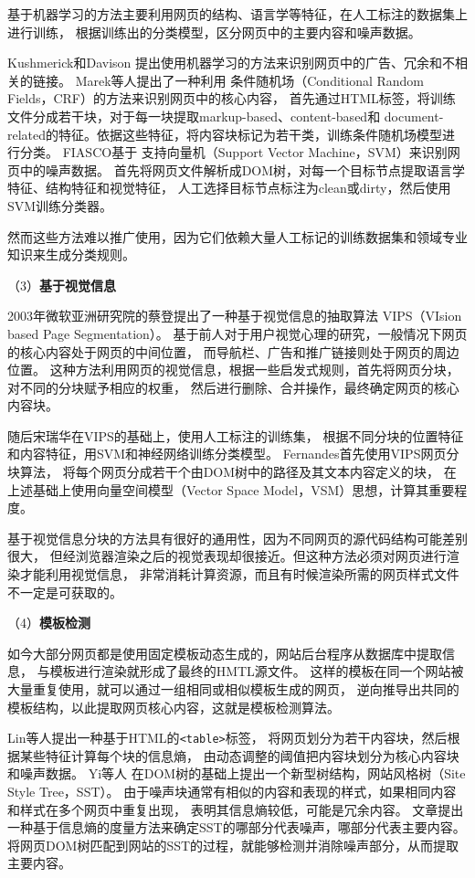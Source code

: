 基于机器学习的方法主要利用网页的结构、语言学等特征，在人工标注的数据集上进行训练，
根据训练出的分类模型，区分网页中的主要内容和噪声数据。

Kushmerick和Davison
提出使用机器学习的方法来识别网页中的广告、冗余和不相关的链接。
Marek等人提出了一种利用
条件随机场（Conditional Random Fields，CRF）的方法来识别网页中的核心内容，
首先通过HTML标签，将训练文件分成若干块，对于每一块提取markup-based、content-based和
document-related的特征。依据这些特征，将内容块标记为若干类，训练条件随机场模型进行分类。
FIASCO基于
支持向量机（Support Vector Machine，SVM）来识别网页中的噪声数据。
首先将网页文件解析成DOM树，对每一个目标节点提取语言学特征、结构特征和视觉特征，
人工选择目标节点标注为clean或dirty，然后使用SVM训练分类器。

然而这些方法难以推广使用，因为它们依赖大量人工标记的训练数据集和领域专业知识来生成分类规则。

（3）\textbf{基于视觉信息}

2003年微软亚洲研究院的蔡登提出了一种基于视觉信息的抽取算法
VIPS（VIsion based Page Segmentation）。
基于前人对于用户视觉心理的研究，一般情况下网页的核心内容处于网页的中间位置，
而导航栏、广告和推广链接则处于网页的周边位置。
这种方法利用网页的视觉信息，根据一些启发式规则，首先将网页分块，对不同的分块赋予相应的权重，
然后进行删除、合并操作，最终确定网页的核心内容块。

随后宋瑞华在VIPS的基础上，使用人工标注的训练集，
根据不同分块的位置特征和内容特征，用SVM和神经网络训练分类模型。
Fernandes首先使用VIPS网页分块算法，
将每个网页分成若干个由DOM树中的路径及其文本内容定义的块，
在上述基础上使用向量空间模型（Vector Space Model，VSM）思想，计算其重要程度。

基于视觉信息分块的方法具有很好的通用性，因为不同网页的源代码结构可能差别很大，
但经浏览器渲染之后的视觉表现却很接近。但这种方法必须对网页进行渲染才能利用视觉信息，
非常消耗计算资源，而且有时候渲染所需的网页样式文件不一定是可获取的。

（4）\textbf{模板检测}

如今大部分网页都是使用固定模板动态生成的，网站后台程序从数据库中提取信息，
与模板进行渲染就形成了最终的HMTL源文件。
这样的模板在同一个网站被大量重复使用，就可以通过一组相同或相似模板生成的网页，
逆向推导出共同的模板结构，以此提取网页核心内容，这就是模板检测算法。

Lin等人提出一种基于HTML的\texttt{<table>}标签，
将网页划分为若干内容块，然后根据某些特征计算每个块的信息熵，
由动态调整的阈值把内容块划分为核心内容块和噪声数据。
Yi等人
在DOM树的基础上提出一个新型树结构，网站风格树（Site Style Tree，SST）。
由于噪声块通常有相似的内容和表现的样式，如果相同内容和样式在多个网页中重复出现，
表明其信息熵较低，可能是冗余内容。
文章提出一种基于信息熵的度量方法来确定SST的哪部分代表噪声，哪部分代表主要内容。
将网页DOM树匹配到网站的SST的过程，就能够检测并消除噪声部分，从而提取主要内容。

